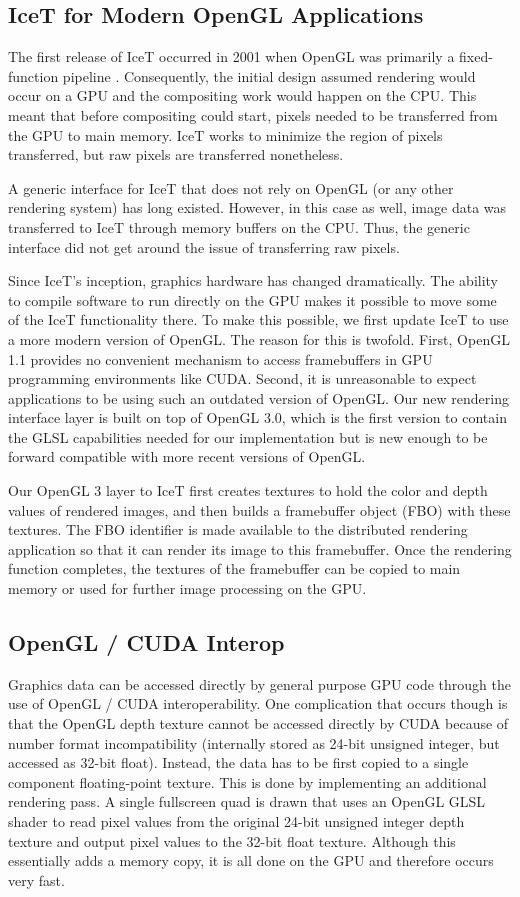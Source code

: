 \documentclass{vgtc}                          %
\begin{document}
\subsection{IceT for Modern OpenGL Applications}
The first release of IceT occurred in 2001 when OpenGL was primarily a fixed-function pipeline \cite{Moreland_2001}. Consequently, the initial design assumed rendering would occur on a GPU and the compositing work would happen on the CPU. This meant that before compositing could start, pixels needed to be transferred from the GPU to main memory. IceT works to minimize the region of pixels transferred, but raw pixels are transferred nonetheless.

A generic interface for IceT that does not rely on OpenGL (or any other rendering system) has long existed. However, in this case as well, image data was transferred to IceT through memory buffers on the CPU. Thus, the generic interface did not get around the issue of transferring raw pixels.

Since IceT's inception, graphics hardware has changed dramatically. The ability to compile software to run directly on the GPU makes it possible to move some of the IceT functionality there. To make this possible, we first update IceT to use a more modern version of OpenGL. The reason for this is twofold. First, OpenGL 1.1 provides no convenient mechanism to access framebuffers in GPU programming environments like CUDA. Second, it is unreasonable to expect applications to be using such an outdated version of OpenGL. Our new rendering interface layer is built on top of OpenGL 3.0, which is the first version to contain the GLSL capabilities needed for our implementation but is new enough to be forward compatible with more recent versions of OpenGL.

Our OpenGL 3 layer to IceT first creates textures to hold the color and depth values of rendered images, and then builds a framebuffer object (FBO) with these textures. The FBO identifier is made available to the distributed rendering application so that it can render its image to this framebuffer. Once the rendering function completes, the textures of the framebuffer can be copied to main memory or used for further image processing on the GPU.

\subsection{OpenGL / CUDA Interop}
Graphics data can be accessed directly by general purpose GPU code through the use of OpenGL / CUDA interoperability. One complication that occurs though is that the OpenGL depth texture cannot be accessed directly by CUDA because of number format incompatibility (internally stored as 24-bit unsigned integer, but accessed as 32-bit float). Instead, the data has to be first copied to a single component floating-point texture. This is done by implementing an additional rendering pass. A single fullscreen quad is drawn that uses an OpenGL GLSL shader to read pixel values from the original 24-bit unsigned integer depth texture and output pixel values to the 32-bit float texture. Although this essentially adds a memory copy, it is all done on the GPU and therefore occurs very fast.
\end{document}
